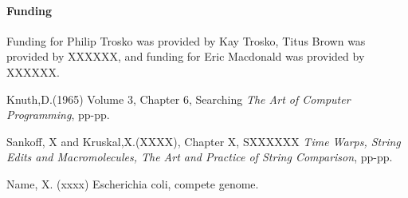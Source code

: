 \documentclass{bioinfo}
\begin{document}
\paragraph{Funding\textcolon} Funding for Philip Trosko was provided by 
Kay Trosko,
Titus Brown was provided by XXXXXX, 
and funding for Eric Macdonald was provided by XXXXXX.

%
%
%
%
%
%
%
%
%


\begin{thebibliography}{}

Knuth,D.(1965) Volume 3, Chapter 6, Searching 
\textit {The Art of Computer Programming}, pp-pp.

Sankoff, X and Kruskal,X.(XXXX), Chapter X, SXXXXXX 
\textit {Time Warps, String Edits and Macromolecules, The Art and Practice of
String Comparison}, pp-pp.

 Name, X. (xxxx) Escherichia coli, compete genome. 

\end{thebibliography}
\end{document}
